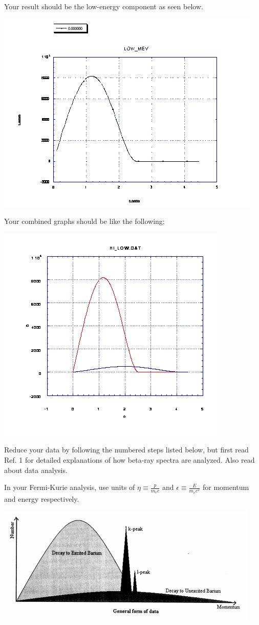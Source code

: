 \documentclass{../lab}
\begin{document}
Your result should be the low-energy component as seen below.
\begin{center}
    \href{http://experimentationlab.berkeley.edu/sites/default/files/images/480px-BRAimage020.gif}{\includegraphics[width=0.5\linewidth]{images/480px-BRAimage020.png}}
\end{center}
Your combined graphs should be like the following;
\begin{center}
    \href{http://experimentationlab.berkeley.edu/sites/default/files/images/BRAimage022.gif}{\includegraphics[width=0.5\linewidth]{images/BRAimage022.png}}
\end{center}
Reduce your data by following the numbered steps listed below, but first read Ref. 1 for detailed explanations of how beta-ray spectra are analyzed. Also read about data analysis.

In your Fermi-Kurie analysis, use units of $\eta \equiv \frac {p}{m_e c}$ and $\epsilon \equiv \frac{E}{m_e c^2}$ for momentum and energy respectively.

\begin{center}
    \href{http://experimentationlab.berkeley.edu/sites/default/files/images/BRAimage025.gif}{\includegraphics[width=0.5\linewidth]{images/BRAimage025.png}}
\end{center}
\end{document}
